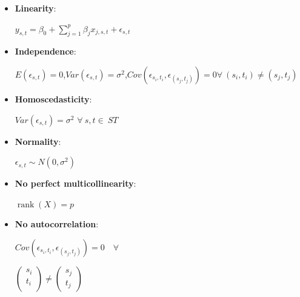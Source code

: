 \documentclass[
  12pt,
]{article}
\begin{document}
\begin{itemize}[label={}]
\item \textbf{Linearity}:\\
  \begin{adjustwidth}{1cm}{0cm} 
  $y_{s,t} = \beta_0 + \sum_{j=1}^{p} \beta_j x_{j,s,t} + \epsilon_{s,t}$
  \end{adjustwidth}
\item \textbf{Independence}:\\
  \begin{adjustwidth}{1cm}{0cm} 
  $E(\epsilon_{s,t}) = 0$,\quad$Var(\epsilon_{s,t}) = \sigma^2$,\quad $Cov(\epsilon_{s_i,t_i},\epsilon_{(s_j,t_j)}) = 0$\quad$\forall\:(s_i,t_i) \neq (s_j,t_j)$ 
  \end{adjustwidth}
\item \textbf{Homoscedasticity}:\\
  \begin{adjustwidth}{1cm}{0cm} $Var(\epsilon_{s,t}) = \sigma^2$  $\forall\:s,t\in\:ST$ \end{adjustwidth}
\item \textbf{Normality}:\\
  \begin{adjustwidth}{1cm}{0cm} $\epsilon_{s,t} \sim N(0, \sigma^2)$ \end{adjustwidth}
\item \textbf{No perfect multicollinearity}:\\
  \begin{adjustwidth}{1cm}{0cm} $\operatorname{rank}(X) = p$ \end{adjustwidth}
\item \textbf{No autocorrelation}:\\
\begin{minipage}{0.5\textwidth}
$Cov(\epsilon_{s_i,t_i}, \epsilon_{(s_j,t_j)}) = 0\quad\forall$
\end{minipage}
\hspace{-4cm}
\begin{minipage}{0.5\textwidth}
$
\begin{pmatrix}
s_i \\
t_i \\
\end{pmatrix}
\neq 
\begin{pmatrix}
s_j \\
t_j
\end{pmatrix}$
\end{minipage}
\end{itemize}
\end{document}
